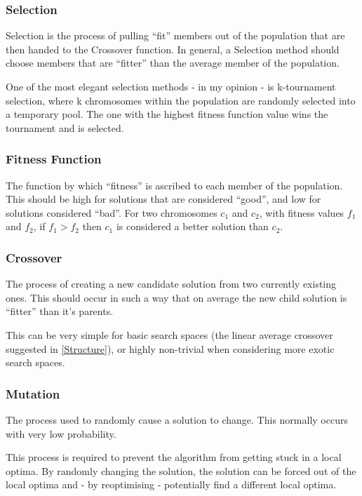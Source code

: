 \subsubsection{Selection} \label{Selection}
Selection is the process of pulling ``fit'' members out of the population that are then handed to the Crossover function. In general, a Selection method should choose members that are ``fitter'' than the average member of the population. \newline

One of the most elegant selection methods - in my opinion - is k-tournament selection, where k chromosomes within the population are randomly selected into a temporary pool. The one with the highest fitness function value wins the tournament and is selected.

\subsubsection{Fitness Function} \label{Fitness}
The function by which ``fitness'' is ascribed to each member of the population. This should be high for solutions that are considered ``good'', and low for solutions considered ``bad''. For two chromosomes $c_1$ and $c_2$, with fitness values $f_1$ and $f_2$, if $f_1 > f_2$ then $c_1$ is considered a better solution than $c_2$. 

\subsubsection{Crossover} \label{Crossover}
The process of creating a new candidate solution from two currently existing ones. This should occur in such a way that on average the new child solution is ``fitter'' than it's parents. \newline

This can be very simple for basic search spaces (the linear average crossover suggested in \ref{Structure}), or highly non-trivial when considering more exotic search spaces.

\subsubsection{Mutation} \label{Mutation}
The process used to randomly cause a solution to change. This normally occurs with very low probability. \newline

This process is required to prevent the algorithm from getting stuck in a local optima. By randomly changing the solution, the solution can be forced out of the local optima and - by reoptimising - potentially find a different local optima.

